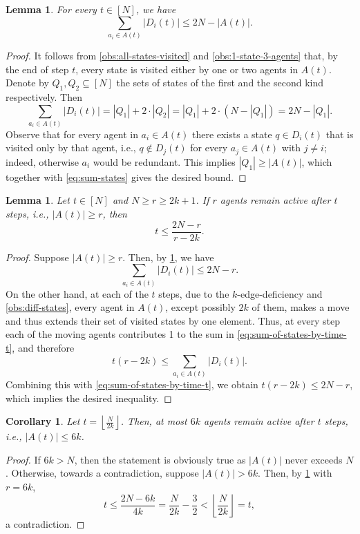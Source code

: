 \documentclass[a4paper,11pt]{article}
\newtheorem{corollary}[theorem]{Corollary}
\newtheorem{lemma}[theorem]{Lemma}
\theoremstyle{definition}
\theoremstyle{remark}
\begin{document}
	\begin{lemma}\label{lem:sum-of-states}
		For every $t \in [N]$, we have 
		\[
		\sum_{a_i \in A(t)} |D_i(t)| \leq 2N-|A(t)|.
		\]
	\end{lemma}
	\begin{proof}
		It follows from \cref{obs:all-states-visited} and \cref{obs:1-state-3-agents} that, by the end of step $t$, every state is visited either by one or two agents in $A(t)$. 
		Denote by $Q_1, Q_2 \subseteq [N]$ the sets of states of the first and the second kind respectively. Then
		\begin{equation}\label{eq:sum-states}
			\sum_{a_i \in A(t)} |D_i(t)|  = 
			|Q_1| + 2 \cdot |Q_2| =
			|Q_1| + 2 \cdot (N - |Q_1|) = 2N - |Q_1|.
		\end{equation}
		Observe that for every agent in $a_i \in A(t)$ there exists a state $q \in D_i(t)$ that is visited only by that agent, i.e., $q \not\in D_j(t)$ for every $a_j \in A(t)$ with $j \neq i$; indeed, otherwise $a_i$ would be redundant. This implies $|Q_1| \geq |A(t)|$, which together with \cref{eq:sum-states} gives the desired bound.
	\end{proof}
	
	
	\begin{lemma}\label{lem:agents-after-N-steps}
		Let $t \in [N]$ and $N \geq r \geq 2k+1$.
		If $r$ agents remain active after $t$ steps, i.e., $|A(t)| \geq r$, then 
		\[
		t \leq \frac{2N-r}{r-2k}.
		\] 
	\end{lemma}
	\begin{proof}
		Suppose $|A(t)| \geq r$. Then, by \cref{lem:sum-of-states}, we have
		\begin{equation}\label{eq:sum-of-states-by-time-t}
			\sum_{a_i \in A(t)} |D_i(t)| \leq 2N - r.
		\end{equation}
		On the other hand, at each of the $t$ steps, due to the $k$-edge-deficiency and \cref{obs:diff-states}, 
        every agent in $A(t)$, except possibly $2k$ of them, makes a move and thus extends their set of visited states by one element. Thus, at every step each of the moving agents contributes 1 to the sum in \cref{eq:sum-of-states-by-time-t}, and therefore 
		\[
			t(r-2k) \leq 
            \sum_{a_i \in A(t)} |D_i(t)|.
		\] 
		Combining this with \cref{eq:sum-of-states-by-time-t}, we obtain $t(r-2k) \leq 2N - r$, which implies the desired inequality.
	\end{proof}
	
	\begin{corollary}\label{cor:active-agents}
		Let $t = \left\lfloor \frac{N}{2k} \right\rfloor$. Then, at most $6k$ agents remain active after $t$ steps, i.e., $|A(t)| \leq 6k$.
	\end{corollary}
	\begin{proof}
        If $6k > N$, then the statement is obviously true as $|A(t)|$ never exceeds $N$.
		Otherwise, towards a contradiction, suppose $|A(t)| > 6k$. Then, by \cref{lem:agents-after-N-steps} with $r=6k$,
		\[
		t \leq \frac{2N-6k}{4k} = \frac{N}{2k} - \frac{3}{2} < \left\lfloor \frac{N}{2k} \right\rfloor = t,
		\]
		a contradiction.
	\end{proof}
\end{document}
